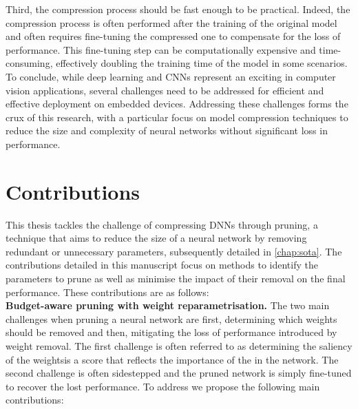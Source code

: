 Third, the compression process should be fast enough to be practical. Indeed,
the compression process is often performed after the training of the original
model and often requires fine-tuning the compressed one to compensate for the
loss of performance. This fine-tuning step can be computationally expensive and
time-consuming, effectively doubling the training time of the model in some
scenarios.\\

To conclude, while deep learning and \DIFdelbegin {}\DIFdelend \DIFaddbegin \acp{CNN} \DIFaddend represent an exciting \DIFdelbegin {}\DIFdelend \DIFaddbegin {}\DIFaddend in computer vision applications, several challenges need to be addressed for
efficient and effective deployment on embedded devices. Addressing these
challenges forms the crux of this research, with a particular focus on model
compression techniques to reduce the size and complexity of neural networks
without significant loss in performance.\\


\section{Contributions}

This thesis tackles the challenge of compressing \acp{DNN} through pruning, a
technique that aims to reduce the size of a neural network by removing redundant
or unnecessary parameters, subsequently detailed in \cref{chap:sota}. The
contributions detailed in this manuscript focus on methods to identify the
parameters to prune as well as minimise the impact of their removal on the final
performance. These contributions are as follows:\\

\noindent \textbf{Budget-aware pruning with weight reparametrisation.} The two
main challenges when pruning a neural network are first, determining which
weights should be removed and then, mitigating the loss of performance
introduced by weight removal. The first challenge is often referred to as
determining the saliency of the weights\DIFdelbegin {}\DIFdelend \DIFaddbegin {}\DIFaddend is a score that reflects the
importance of the \DIFdelbegin {}\DIFdelend \DIFaddbegin {}\DIFaddend in the network. The second challenge is often
sidestepped and the pruned network is simply fine-tuned to recover the lost
performance. To address \DIFdelbegin {}\DIFdelend \DIFaddbegin {}\DIFaddend we propose the following main
contributions:

